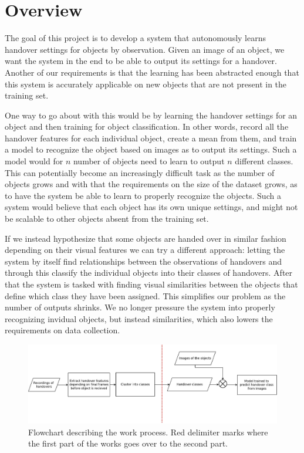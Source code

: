\section{Overview}

The goal of this project is to develop a system that autonomously learns handover settings for objects by observation. Given an image of an object, we want the system in the end to be able to output its settings for a handover. Another of our requirements is that the learning has been abstracted enough that this system is accurately applicable on new objects that are not present in the training set.

One way to go about with this would be by learning the handover settings for an object and then training for object classification. In other words, record all the handover features for each individual object, create a mean from them, and train a model to recognize the object based on images as to output its settings. Such a model would for \(n\) number of objects need to learn to output \(n\) different classes. This can potentially become an increasingly difficult task as the number of objects grows and with that the requirements on the size of the dataset grows, as to have the system be able to learn to properly recognize the objects. Such a system would believe that each object has its own unique settings, and might not be scalable to other objects absent from the training set.

If we instead hypothesize that some objects are handed over in similar fashion depending on their visual features we can try a different approach: letting the system by itself find relationships between the observations of handovers and through this classify the individual objects into their classes of handovers. After that the system is tasked with finding visual similarities between the objects that define which class they have been assigned. This simplifies our problem as the number of outputs shrinks. We no longer pressure the system into properly recognizing invidual objects, but instead similarities, which also lowers the requirements on data collection.

\begin{figure}
	\centering
	\includegraphics[width=\textwidth]{img/methods/flowchart.jpg}
	\caption{Flowchart describing the work process. Red delimiter marks where the first part of the works goes over to the second part.}
	\label{fig:flowchart}
\end{figure}

